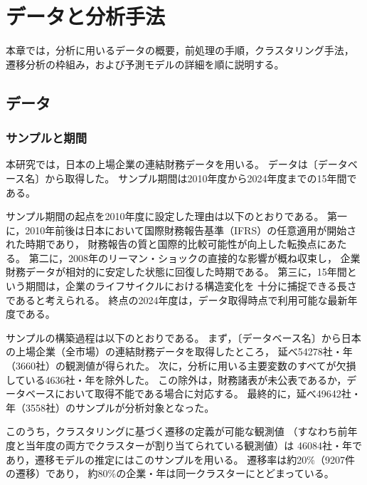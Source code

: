 \chapter{データと分析手法}
\label{chap:data-method}

本章では，分析に用いるデータの概要，前処理の手順，クラスタリング手法，
遷移分析の枠組み，および予測モデルの詳細を順に説明する。

\section{データ}
\label{sec:data}

\subsection{サンプルと期間}

本研究では，日本の上場企業の連結財務データを用いる。
データは〔データベース名〕から取得した。
サンプル期間は2010年度から2024年度までの15年間である。

サンプル期間の起点を2010年度に設定した理由は以下のとおりである。
第一に，2010年前後は日本において国際財務報告基準（IFRS）の任意適用が開始された時期であり，
財務報告の質と国際的比較可能性が向上した転換点にあたる。
第二に，2008年のリーマン・ショックの直接的な影響が概ね収束し，
企業財務データが相対的に安定した状態に回復した時期である。
第三に，15年間という期間は，企業のライフサイクルにおける構造変化を
十分に捕捉できる長さであると考えられる。
終点の2024年度は，データ取得時点で利用可能な最新年度である。

サンプルの構築過程は以下のとおりである。
まず，〔データベース名〕から日本の上場企業（全市場）の連結財務データを取得したところ，
延べ\num{54278}社・年（\num{3660}社）の観測値が得られた。
次に，分析に用いる主要変数のすべてが欠損している\num{4636}社・年を除外した。
この除外は，財務諸表が未公表であるか，データベースにおいて取得不能である場合に対応する。
最終的に，延べ\num{49642}社・年（\num{3558}社）のサンプルが分析対象となった。

このうち，クラスタリングに基づく遷移の定義が可能な観測値
（すなわち前年度と当年度の両方でクラスターが割り当てられている観測値）は
\num{46084}社・年であり，遷移モデルの推定にはこのサンプルを用いる。
遷移率は約20\%（\num{9207}件の遷移）であり，
約80\%の企業・年は同一クラスターにとどまっている。

